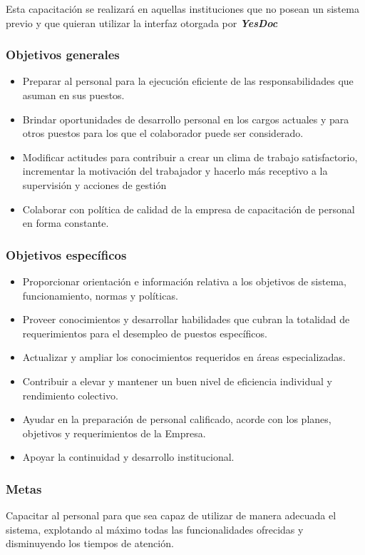 \documentclass[a4paper,12pt]{article}
\begin{document}
Esta capacitación se realizará en aquellas instituciones que no posean un sistema previo y que quieran utilizar la interfaz otorgada por \textbf{\emph{YesDoc}}




\subsubsection{Objetivos generales}
\begin{itemize}
	\item Preparar al personal para la ejecución eficiente de las responsabilidades que
	asuman en sus puestos.
	\item Brindar oportunidades de desarrollo personal en los cargos actuales y para
	otros puestos para los que el colaborador puede ser considerado.
	\item Modificar actitudes para contribuir a crear un clima de trabajo satisfactorio,
	incrementar la motivación del trabajador y hacerlo más receptivo a la
	supervisión y acciones de gestión
	\item Colaborar con política de calidad de la empresa de capacitación de personal
	en forma constante.
\end{itemize}

\subsubsection{Objetivos específicos}
\begin{itemize}
	\item Proporcionar orientación e información relativa a los objetivos de sistema, funcionamiento, normas y políticas.
	\item Proveer conocimientos y desarrollar habilidades que cubran la totalidad de
	requerimientos para el desempleo de puestos específicos.
	\item  Actualizar y ampliar los conocimientos requeridos en áreas especializadas.
	\item Contribuir a elevar y mantener un buen nivel de eficiencia individual y
	rendimiento colectivo.
	\item  Ayudar en la preparación de personal calificado, acorde con los planes,
	objetivos y requerimientos de la Empresa.
	\item  Apoyar la continuidad y desarrollo institucional.
\end{itemize}

\subsubsection{Metas}
Capacitar al personal para que sea capaz de utilizar de manera adecuada el sistema, explotando al máximo todas las funcionalidades ofrecidas y disminuyendo los tiempos de atención.
\end{document}
